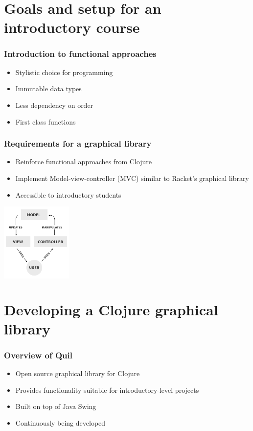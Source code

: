 \documentclass{beamer}
\newcommand{\comment}[1]{{\bf \tt  {#1}}}
\newcommand{\pscomment}[1]{\textcolor{red}{\comment{Paul: {#1}}}}
\begin{document}
\section{Goals and setup for an introductory course}

\begin{frame}
\frametitle{Introduction to functional approaches}
\begin{itemize}
\item Stylistic choice for programming
\item Immutable data types
\item Less dependency on order
\item First class functions
\end{itemize}
\end{frame}

\begin{frame}
\frametitle{Requirements for a graphical library}
\begin{itemize}
\item Reinforce functional approaches from Clojure
\item Implement Model-view-controller (MVC) similar to Racket's graphical library
\item Accessible to introductory students
\end{itemize}
\begin{center}
\includegraphics[width=100pt]{MVC-Process}
\end{center}
\end{frame}

\section{Developing a Clojure graphical library}

\begin{frame}
\frametitle{Overview of Quil}
\begin{itemize}
\item Open source graphical library for Clojure
\item Provides functionality suitable for introductory-level projects
\item Built on top of Java Swing
\item Continuously being developed
\end{itemize}
\end{frame}
\end{document}
